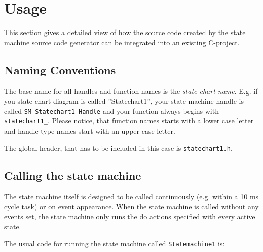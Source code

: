 %

\section{Usage}

This section gives a detailed view of how the source code created by the state
machine source code generator can be integrated into an existing C-project.

\subsection{Naming Conventions}

The base name for all handles and function names is the \textit{state chart
name}. E.g. if you state chart diagram is called ''Statechart1'', your state
machine handle is called \texttt{SM\_Statechart1\_Handle} and your function
always begins with \texttt{statechart1\_}. Please notice, that function names
starts with a lower case letter and handle type names start with an upper case
letter.

The global header, that has to be included in this case is
\texttt{statechart1.h}.

\subsection{Calling the state machine}

The state machine itself is designed to be called continuously (e.g. within a 10
ms cycle task) or on event appearance. When the state machine is called without
any events set, the state machine only runs the do actions specified with every
active state.

The usual code for running the state machine called \texttt{Statemachine1} is:

